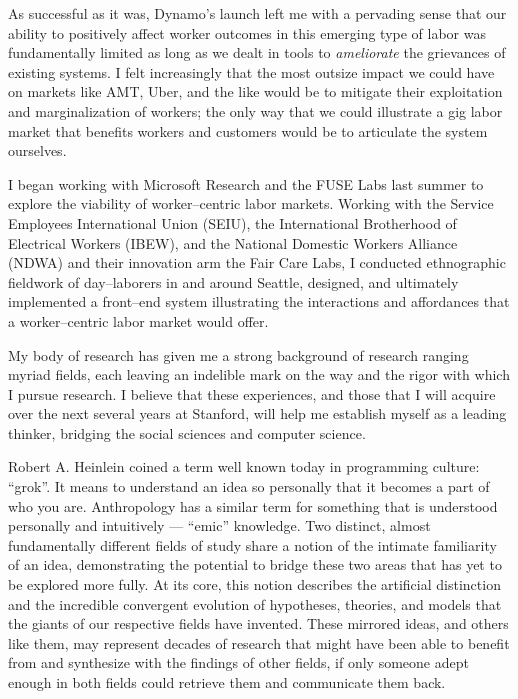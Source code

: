 \documentclass[12pt]{article}
\begin{document}
As successful as it was, Dynamo's launch
left me with a pervading sense that
our ability to positively affect worker outcomes in this emerging type of labor was fundamentally limited as long as we dealt in tools to \textit{ameliorate} the grievances of existing systems.
I felt increasingly that the most outsize impact we could have on markets like AMT, Uber, and the like would be to mitigate their exploitation and marginalization of workers;
the only way that we could illustrate a gig labor market that benefits workers and customers would be to articulate the system ourselves.

I began working with Microsoft Research and the FUSE Labs last summer to explore the viability of worker--centric labor markets.
Working with the Service Employees International Union (SEIU), the International Brotherhood of Electrical Workers (IBEW), and the National Domestic Workers Alliance (NDWA) and their innovation arm the Fair Care Labs,
I conducted ethnographic fieldwork of day--laborers in and around Seattle, designed, and ultimately implemented a front--end system illustrating the interactions and affordances that a worker--centric labor market would offer.

My body of research has given me a strong background of research ranging myriad fields,
each leaving an indelible mark on the way and the rigor with which I pursue research.
I believe that these experiences,
and those that I will acquire over the next several years at Stanford,
will help me establish myself as a leading thinker, bridging the social sciences and computer science.

Robert A.
Heinlein coined a term well known today in programming culture: ``grok''.
It means to understand an idea so personally that it becomes a part of who you are.
Anthropology has a similar term for something that is understood personally and intuitively
--- ``emic'' knowledge.
Two distinct,
almost fundamentally different fields of study share a notion of the intimate familiarity of an idea,
demonstrating the potential to bridge these two areas that has yet to be explored more fully.
At its core,
this notion describes the artificial distinction and the incredible convergent evolution of hypotheses,
theories,
and models that the giants of our respective fields have invented.
These mirrored ideas,
and others like them,
may represent decades of research that might have been able to benefit from and synthesize with the findings of other fields,
if only someone adept enough in both fields could retrieve them and communicate them back.
\end{document}
